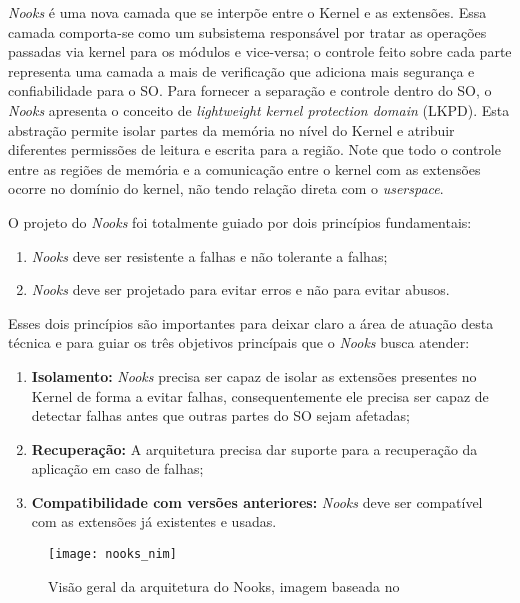 \emph{Nooks} é uma nova camada que se interpõe entre o Kernel e as extensões.
Essa camada comporta-se como um subsistema responsável por tratar as operações
passadas via kernel para os módulos e vice-versa; o controle feito sobre cada
parte representa uma camada a mais de verificação que adiciona mais segurança e
confiabilidade para o SO. Para fornecer a separação e controle dentro do SO, o
\emph{Nooks} apresenta o conceito de \emph{lightweight kernel protection
domain} (LKPD). Esta abstração permite isolar partes da memória no nível do
Kernel e atribuir diferentes permissões de leitura e escrita para a região.
Note que todo o controle entre as regiões de memória e a comunicação entre o
kernel com as extensões ocorre no domínio do kernel, não tendo relação direta
com o \emph{userspace}.

O projeto do \emph{Nooks} foi totalmente guiado por dois princípios
fundamentais:
\begin{enumerate}
	\item \emph{Nooks} deve ser resistente a falhas e não tolerante a falhas;
	\item \emph{Nooks} deve ser projetado para evitar erros e não para evitar
				abusos.
\end{enumerate}
Esses dois princípios são importantes para deixar claro a área de atuação desta
técnica e para guiar os três objetivos princípais que o \emph{Nooks} busca
atender:
\begin{enumerate}
	\item \textbf{Isolamento:} \emph{Nooks} precisa ser capaz de isolar as
				extensões presentes no Kernel de forma a evitar falhas, consequentemente
				ele precisa ser capaz de detectar falhas antes que outras partes do
				SO sejam afetadas;
	\item \textbf{Recuperação:} A arquitetura precisa dar suporte para a
				recuperação da aplicação em caso de falhas;
	\item \textbf{Compatibilidade com versões anteriores:} \emph{Nooks} deve ser
				compatível com as extensões já existentes e usadas.
\end{enumerate}

\begin{figure}[!h]
  \centering
  \texttt{[image: nooks\_nim]}
  \caption{Visão geral da arquitetura do Nooks, imagem baseada no \citep{nooks}}
  \label{fig:nooks_nim}
\end{figure}

